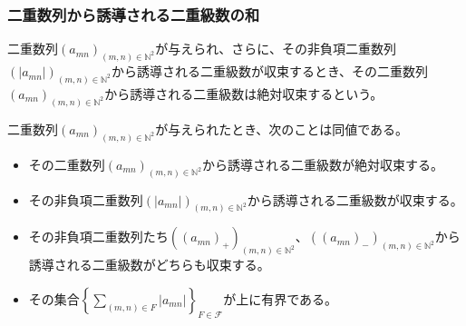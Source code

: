 \documentclass[dvipdfmx]{jsarticle}
\begin{document}
\subsubsection{二重数列から誘導される二重級数の和}%
\begin{dfn}
二重数列$\left( a_{mn} \right)_{(m,n) \in \mathbb{N}^{2}}$が与えられ、さらに、その非負項二重数列$\left( \left| a_{mn} \right| \right)_{(m,n) \in \mathbb{N}^{2}}$から誘導される二重級数が収束するとき、その二重数列$\left( a_{mn} \right)_{(m,n) \in \mathbb{N}^{2}}$から誘導される二重級数は絶対収束するという。
\end{dfn}
\begin{thm}\label{4.1.9.4}
二重数列$\left( a_{mn} \right)_{(m,n) \in \mathbb{N}^{2}}$が与えられたとき、次のことは同値である。
\begin{itemize}
\item
  その二重数列$\left( a_{mn} \right)_{(m,n) \in \mathbb{N}^{2}}$から誘導される二重級数が絶対収束する。
\item
  その非負項二重数列$\left( \left| a_{mn} \right| \right)_{(m,n) \in \mathbb{N}^{2}}$から誘導される二重級数が収束する。
\item
  その非負項二重数列たち$\left( \left( a_{mn} \right)_{+} \right)_{(m,n) \in \mathbb{N}^{2}}$、$\left( \left( a_{mn} \right)_{-} \right)_{(m,n) \in \mathbb{N}^{2}}$から誘導される二重級数がどちらも収束する。
\item
  その集合$\left\{ \sum_{(m,n) \in F}\left| a_{mn} \right| \right\}_{F \in \mathcal{F}}$が上に有界である。
\end{itemize}
\end{thm}
\end{document}
